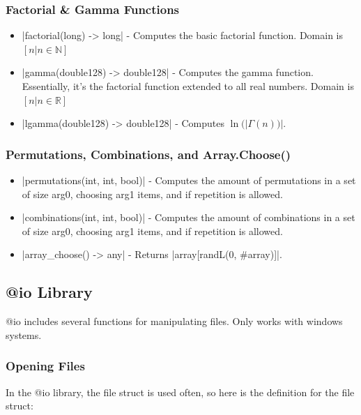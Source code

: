 \documentclass[12pt, letterpaper, oneside]{article}
\begin{document}
	\subsubsection{Factorial \& Gamma Functions}
		\begin{itemize}
			\item[--] \spverb|factorial(long) -> long| - Computes the basic factorial function. Domain is $[n | n \in \mathbb{N}]$
			\item[--] \spverb|gamma(double128) -> double128| - Computes the gamma function. Essentially, it's the factorial function extended to all real numbers. Domain is $[n | n \in \mathbb{R}]$
			\item[--] \spverb|lgamma(double128) -> double128| - Computes $\ln(|\Gamma(n))|$.
		\end{itemize}
	\subsubsection{Permutations, Combinations, and Array.Choose()}
		\begin{itemize}
			\item[--] \spverb|permutations(int, int, bool)| - Computes the amount of permutations in a set of size arg0, choosing arg1 items, and if repetition is allowed.
			\item[--] \spverb|combinations(int, int, bool)| - Computes the amount of combinations in a set of size arg0, choosing arg1 items, and if repetition is allowed.
			\item[--] \spverb|array_choose() -> any| - Returns \spverb|array[randL(0, #array)]|.
		\end{itemize}
	\subsection{@io Library}
	@io includes several functions for manipulating files. Only works with windows systems.
	\subsubsection{Opening Files}
		In the @io library, the file struct is used often, so here is the definition for the file struct:
		
\end{document}
